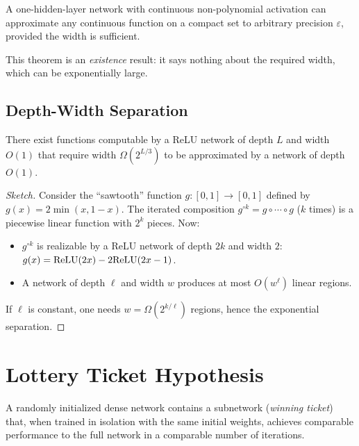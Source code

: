 \begin{theorem}
\label{thm:universal-approx}
A one-hidden-layer network with continuous non-polynomial activation
can approximate any continuous function on a compact set to arbitrary
precision $\varepsilon$, provided the width is sufficient.
\end{theorem}

\begin{warning}
This theorem is an \emph{existence} result: it says nothing about
the required width, which can be exponentially large.
\end{warning}

\subsection{Depth-Width Separation}

\begin{theorem}[Telgarsky, 2016]
\label{thm:depth-separation}
There exist functions computable by a ReLU network of depth $L$
and width $O(1)$ that require width $\Omega(2^{L/3})$ to be
approximated by a network of depth $O(1)$.
\end{theorem}

\begin{proof}[Sketch]
Consider the ``sawtooth'' function $g : [0,1] \to [0,1]$
defined by $g(x) = 2\min(x, 1-x)$. The iterated composition
$g^{\circ k} = g \circ \cdots \circ g$ ($k$ times) is a piecewise
linear function with $2^k$ pieces. Now:
\begin{itemize}
    \item $g^{\circ k}$ is realizable by a ReLU network of depth $2k$
          and width $2$: $g(x) = \mathrm{ReLU}(2x) - 2\mathrm{ReLU}(2x - 1)$.
    \item A network of depth $\ell$ and width $w$ produces at most
          $O(w^\ell)$ linear regions.
\end{itemize}
If $\ell$ is constant, one needs $w = \Omega(2^{k/\ell})$ regions,
hence the exponential separation.
\end{proof}

\section{Lottery Ticket Hypothesis}
\label{sec:lottery-ticket}

\begin{theorem}
\label{thm:lottery}
A randomly initialized dense network contains a subnetwork
(\emph{winning ticket}) that, when trained in isolation with the same initial
weights, achieves comparable performance to the full network in a
comparable number of iterations.
\end{theorem}

